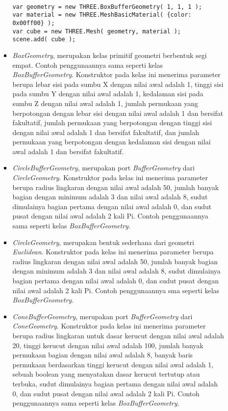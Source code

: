 \documentclass[a4paper,twoside]{article}
\begin{document}
\begin{enumerate}
\begin{itemize}
\begin{itemize}
\begin{lstlisting}[caption={Contoh penggunaan kelas {\it BoxBufferGeometry}.},captionpos=b]

var geometry = new THREE.BoxBufferGeometry( 1, 1, 1 );
var material = new THREE.MeshBasicMaterial( {color: 0x00ff00} );
var cube = new THREE.Mesh( geometry, material );
scene.add( cube );
\end{lstlisting}

	\item {\it BoxGeometry}, merupakan kelas primitif geometri berbentuk segi empat. Contoh penggunaannya sama seperti kelas {\it BoxBufferGeometry}. Konstruktor pada kelas ini menerima parameter berupa lebar sisi pada sumbu X dengan nilai awal adalah 1, tinggi sisi pada sumbu Y dengan nilai awal adalah 1, kedalaman sisi pada sumbu Z dengan nilai awal adalah 1, jumlah permukaan yang berpotongan dengan lebar sisi dengan nilai awal adalah 1 dan bersifat fakultatif,  jumlah permukaan yang berpotongan dengan tinggi sisi dengan nilai awal adalah 1 dan bersifat fakultatif,  dan jumlah permukaan yang berpotongan dengan kedalaman sisi dengan nilai awal adalah 1 dan bersifat fakultatif.
	
	\item {\it CircleBufferGeometry}, merupakan port {\it BufferGeometry} dari {\it CircleGeometry}. Konstruktor pada kelas ini menerima parameter berupa radius lingkaran dengan nilai awal adalah 50, jumlah banyak bagian dengan minimum adalah 3 dan nilai awal adalah 8, sudut dimulainya bagian pertama dengan nilai awal adalah 0, dan sudut pusat dengan nilai awal adalah 2 kali Pi. Contoh penggunaannya sama seperti kelas {\it BoxBufferGeometry}.

	\item {\it CircleGeometry}, merupakan bentuk sederhana dari geometri {\it Euclidean}. Konstruktor pada kelas ini menerima parameter berupa radius lingkaran dengan nilai awal adalah 50, jumlah banyak bagian dengan minimum adalah 3 dan nilai awal adalah 8, sudut dimulainya bagian pertama dengan nilai awal adalah 0, dan sudut pusat dengan nilai awal adalah 2 kali Pi. Contoh penggunaannya sma seperti kelas {\it BoxBufferGeometry}.
	
	\item {\it ConeBufferGeometry}, merupakan port {\it BufferGeometry} dari {\it ConeGeometry}. Konstruktor pada kelas ini menerima parameter berupa radius lingkaran untuk dasar kerucut dengan nilai awal adalah 20, tinggi kerucut dengan nilai awal adalah 100, jumlah banyak permukaan bagian dengan nilai awal adalah 8, banyak baris permukaan berdasarkan tinggi kerucut dengan nilai awal adalah 1, sebuah boolean yang menyatakan dasar kerucut tertutup atau terbuka, sudut dimulainya bagian pertama dengan nilai awal adalah 0, dan sudut pusat dengan nilai awal adalah 2 kali Pi. Contoh penggunaannya sama seperti kelas {\it BoxBufferGeometry}.
	

\end{itemize}
\end{itemize}
\end{enumerate}
\end{document}
